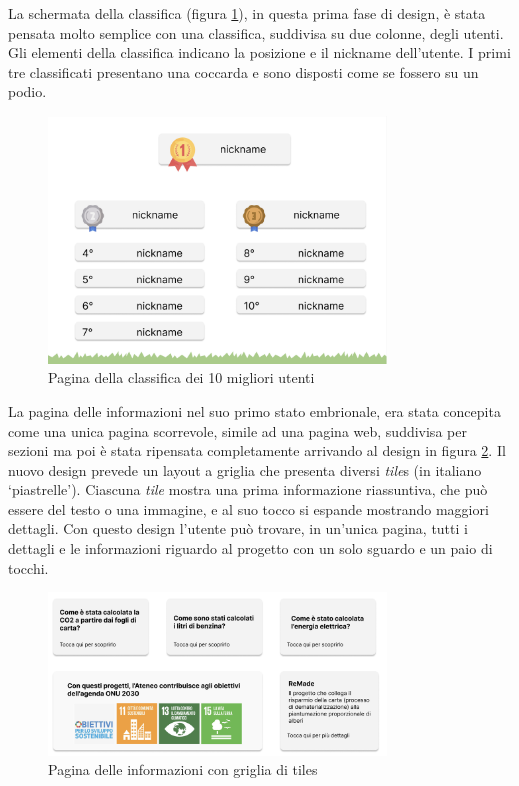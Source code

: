 La schermata della classifica (figura \ref{fig:chartPage}), in questa prima fase di design, è stata pensata molto semplice con una classifica, suddivisa su due colonne, degli utenti. Gli elementi della classifica indicano la posizione e il nickname dell'utente. I primi tre classificati presentano una coccarda e sono disposti come se fossero su un podio.
\begin{figure}
    \centering
    \includegraphics[width=0.8\textwidth]{img/totem/topchartPage.png}
    \caption[Classifica Top10 nel totem]{Pagina della classifica dei 10 migliori utenti}
    \label{fig:chartPage}
\end{figure}

La pagina delle informazioni nel suo primo stato embrionale, era stata concepita come una unica pagina scorrevole, simile ad una pagina web, suddivisa per sezioni ma poi è stata ripensata completamente arrivando al design in figura \ref{fig:infoPage}. Il nuovo design prevede un layout a griglia che presenta diversi \textit{tile}s (in italiano \enquote*{piastrelle}). Ciascuna \textit{tile} mostra una prima informazione riassuntiva, che può essere del testo o una immagine, e al suo tocco si espande mostrando maggiori dettagli. Con questo design l'utente può trovare, in un'unica pagina, tutti i dettagli e le informazioni riguardo al progetto con un solo sguardo e un paio di tocchi.

\begin{figure}
    \centering
    \includegraphics[width=0.8\textwidth]{img/totem/infoPage.png}
    \caption{Pagina delle informazioni con griglia di tiles}
    \label{fig:infoPage}
\end{figure}

